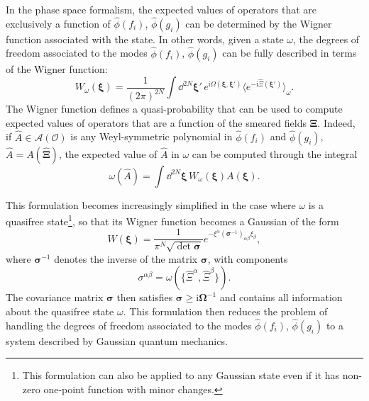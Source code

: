 \documentclass[letterpaper,12pt,titlepage,oneside,final]{book}
\newcommand{\ii}{\mathrm{i}}
\begin{document}
In the phase space formalism, the expected values of operators that are exclusively a function of $\hat{\phi}(f_i)$, $\hat{\phi}(g_i)$ can be determined by the Wigner function associated with the state. In other words, given a state $\omega$, the degrees of freedom associated to the modes $\hat{\phi}(f_i)$, $\hat{\phi}(g_i)$ can be fully described in terms of the Wigner function:
\begin{equation}
W_{\omega}(\bm\xi) = \frac{1}{(2\pi)^{2N}}\int \dd^{2N}\bm\xi'\,e^{\ii\Omega(\bm\xi,\bm\xi')} \big\langle e^{-\ii\hat\Xi(\bm\xi')} \big\rangle_\omega.
\end{equation}
The Wigner function defines a quasi-probability that can be used to compute expected values of operators that are a function of the smeared fields $\bm \Xi$. Indeed, if $\hat{A}\in\mathcal{A}(\mathcal{O})$ is any Weyl-symmetric polynomial in $\hat{\phi}(f_i)$ and $\hat{\phi}(g_i)$, $\hat{A} = A(\hat{\bm \Xi})$, the expected value of $\hat{A}$ in $\omega$ can be computed through the integral
\begin{equation}
    \omega(\hat{A}) = \int \dd^{2N} \bm \xi\, W_\omega(\bm \xi) A(\bm \xi).   
\end{equation}

This formulation becomes increasingly simplified in the case where $\omega$ is a quasifree state\footnote{This formulation can also be applied to any Gaussian state even if it has non-zero one-point function with minor changes.}, so that its Wigner function becomes a Gaussian of the form
\begin{equation}
    W(\bm \xi) = \frac{1}{\pi^N\sqrt{\det\bm \sigma}} e^{- \xi^\alpha (\bm \sigma^{-1})_{\alpha \beta} \xi_\beta},
\end{equation}
where $\bm \sigma^{-1}$ denotes the inverse of the matrix $\bm \sigma$, with components
\begin{equation}
    \sigma^{\alpha\beta} = \omega(\{\hat{\Xi}^\alpha,\hat{\Xi}^\beta\}).
\end{equation}
The covariance matrix $\bm \sigma$ then satisfies $\bm \sigma \geq \ii \bm \Omega^{-1}$ and contains all information about the quasifree state $\omega$. This formulation then reduces the problem of handling the degrees of freedom associated to the modes $\hat{\phi}(f_i)$, $\hat{\phi}(g_i)$ to a system described by Gaussian quantum mechanics.
\end{document}
